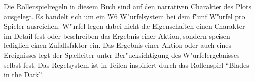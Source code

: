 
Die Rollenspielregeln in diesem Buch sind auf den narrativen Charakter des Plots ausgelegt. Es handelt sich um ein W6 W"urfelsystem bei dem f"unf W"urfel pro Spieler ausreichen. W"urfel legen dabei nicht die Eigenschaften einen Charakter im Detail fest oder beschreiben das Ergebnis einer Aktion, sondern speisen lediglich einen Zufallsfaktor ein. Das Ergebnis einer Aktion oder auch eines Ereignisses legt der Spielleiter unter Ber"ucksichtigung des W"urfelergebnisses selbst fest. Das Regelsystem ist in Teilen inspiriert durch das Rollenspiel ``Blades in the Dark''.











